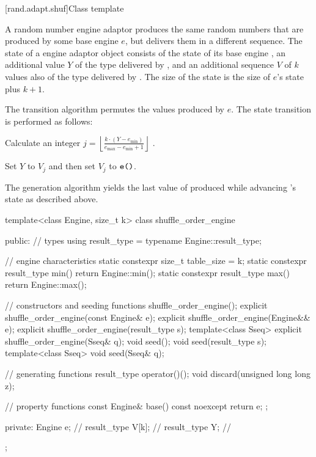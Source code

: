 [rand.adapt.shuf]{Class template }%
%

\pnum
A  random number engine adaptor
produces the same random numbers
that are produced by some base engine $e$,
but delivers them in a different sequence.
The state%
%
of a  engine adaptor object 
consists of
 the state  of its base engine ,
 an additional value $Y$ of the type delivered by ,
and
 an additional sequence $V$ of $k$ values
 also of the type delivered by .
The size of the state is
 the size of $e$'s state plus $k+1$.

\pnum
The transition algorithm%
%
permutes the values produced by $e$.
The state transition is performed as follows:
\begin{enumeratea}
 \item
   Calculate an integer
   $j = \left\lfloor \frac{k \cdot (Y - e_{\min})}
                          {e_{\max} - e_{\min} +1}
        \right\rfloor
   $%
   .
 \item
   Set $Y$ to $V_j$ and then set $V_j$ to $\texttt{e()}$.
\end{enumeratea}

\pnum
The generation algorithm%
%
yields the last value of 
 produced while advancing 's state as described above.

%
\begin{codeblock}
template<class Engine, size_t k>
  class shuffle_order_engine {
  public:
    // types
    using result_type = typename Engine::result_type;

    // engine characteristics
    static constexpr size_t table_size = k;
    static constexpr result_type min() { return Engine::min(); }
    static constexpr result_type max() { return Engine::max(); }

    // constructors and seeding functions
    shuffle_order_engine();
    explicit shuffle_order_engine(const Engine& e);
    explicit shuffle_order_engine(Engine&& e);
    explicit shuffle_order_engine(result_type s);
    template<class Sseq> explicit shuffle_order_engine(Sseq& q);
    void seed();
    void seed(result_type s);
    template<class Sseq> void seed(Sseq& q);

    // generating functions
    result_type operator()();
    void discard(unsigned long long z);

    // property functions
    const Engine& base() const noexcept { return e; };

  private:
    Engine e;           // \expos
    result_type V[k];   // \expos
    result_type Y;      // \expos
  };
\end{codeblock}

